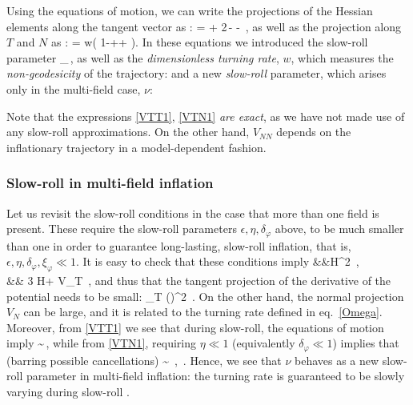 Using the equations of motion, we can  write  the projections of the Hessian elements along the tangent vector as  \cite{Achucarro:2010da,Hetz:2016ics,Christodoulidis:2018qdw,Chakraborty:2019dfh}:
\be\label{VTT1}
 =   + 2\,\epsilon - -
   \,,
\ee
as well as the projection along $T $ and $N$ as \cite{Aragam:2021scu}:
\be
\label{VTN1}
 = w\left( 1-\epsilon+\frac{}+\frac{} \right).
\ee
In these equations  we  introduced  the slow-roll parameter
\be
\xi_\varphi\equiv {}\,,
\ee
as well as the {\em dimensionless turning rate}, $w$, which measures the {\em non-geodesicity} of the trajectory:
\be\label{eq:w}
\setlength\fboxsep{0.25cm}
\setlength\fboxrule{0.4pt}
\ee
and a new {\em slow-roll} parameter, which arises only in the multi-field case, $\nu$:
\be\label{eq:nu}
\setlength\fboxsep{0.25cm}
\setlength\fboxrule{0.4pt}
\ee

\smallskip

\ni Note  that the expressions \eqref{VTT1}, \eqref{VTN1}  {\em are exact}, as we have not made use of any slow-roll approximations.
 On the other hand, $V_{NN}$ depends on the inflationary trajectory in a model-dependent fashion.

\subsubsection{Slow-roll in multi-field inflation}

Let us revisit the slow-roll conditions in the case that more than one field is present. These  require the  slow-roll parameters $\epsilon, \eta, \delta_\varphi $ above, to be much smaller than one in order to guarantee long-lasting, slow-roll inflation, that is,  $\epsilon, \eta, \delta_\varphi, \xi_\varphi \ll 1$. It is easy to check that these conditions imply
\bea
&&H^2 \simeq {} \,, \\
&& 3 H\dot \varphi + V_T  \,, 
\eea
and thus that the tangent projection of the derivative of the potential needs to be  small:
\be\label{epT}
\epsilon_T \equiv {} \left(\right)^2   \,.
\ee
On the other hand, the normal projection $V_N$ can be large,  and it is related to the turning rate defined in eq.~\eqref{Omega}.
Moreover, from \eqref{VTT1} we see that during slow-roll, the equations of motion imply
\be\label{VTTsr}
 \sim {}\,,
\ee
while from \eqref{VTN1}, requiring $\eta\ll1$ (equivalently $\delta_\varphi \ll 1$) implies that (barring possible cancellations)
\be\label{VTN_slowroll}
   \sim {} \,,  \qquad
     \nu {}\,.
\ee
Hence, we see that $\nu$ behaves as a new slow-roll parameter in multi-field inflation: the turning rate is guaranteed to be slowly varying during slow-roll \cite{Aragam:2020uqi,Aragam:2021scu}.

